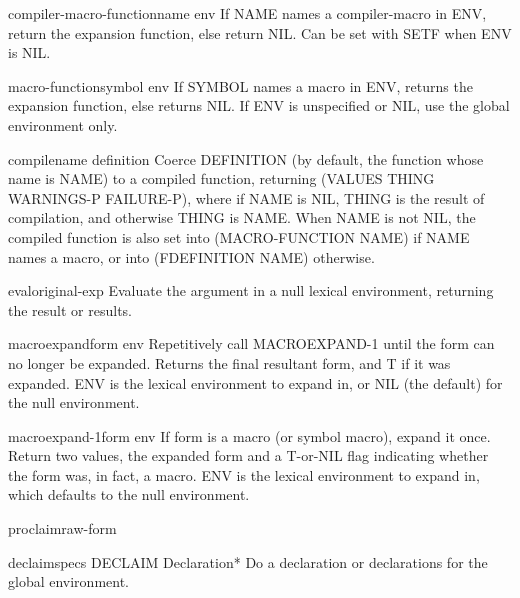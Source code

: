 \documentclass[10pt,english]{book}
\begin{document}
\begin{accessor}{compiler-macro-function}{name \op env}
  If NAME names a compiler-macro in ENV, return the expansion function, else
return NIL. Can be set with SETF when ENV is NIL.
\end{accessor}

\begin{accessor}{macro-function}{symbol \op env}
  If SYMBOL names a macro in ENV, returns the expansion function,
else returns NIL. If ENV is unspecified or NIL, use the global environment
only.
\end{accessor}

\begin{function}{compile}{name \op definition}
  Coerce DEFINITION (by default, the function whose name is NAME)
  to a compiled function, returning (VALUES THING WARNINGS-P FAILURE-P),
  where if NAME is NIL, THING is the result of compilation, and
  otherwise THING is NAME. When NAME is not NIL, the compiled function
  is also set into (MACRO-FUNCTION NAME) if NAME names a macro, or into
  (FDEFINITION NAME) otherwise.
\end{function}

\begin{function}{eval}{original-exp}
  Evaluate the argument in a null lexical environment, returning the
   result or results.
\end{function}

\begin{function}{macroexpand}{form \op env}
  Repetitively call MACROEXPAND-1 until the form can no longer be expanded.
   Returns the final resultant form, and T if it was expanded. ENV is the
   lexical environment to expand in, or NIL (the default) for the null
   environment.
\end{function}

\begin{function}{macroexpand-1}{form \op env}
  If form is a macro (or symbol macro), expand it once. Return two values,
   the expanded form and a T-or-NIL flag indicating whether the form was, in
   fact, a macro. ENV is the lexical environment to expand in, which defaults
   to the null environment.
\end{function}

\begin{function}{proclaim}{raw-form}
  
\end{function}


\begin{macro}{declaim}{\rest specs}
  DECLAIM Declaration*
  Do a declaration or declarations for the global environment.
\end{macro}
\end{document}
